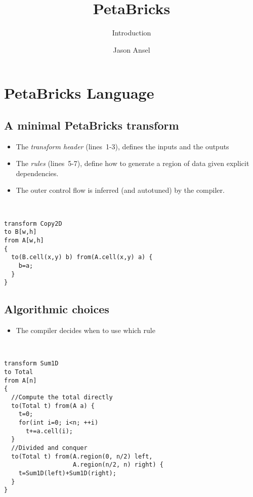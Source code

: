 \documentclass{beamer}
\title{PetaBricks}
\subtitle{Introduction}
\author{Jason Ansel}
\begin{document}


\section{PetaBricks Language}

\subsection{A minimal PetaBricks transform}

\begin{frame}[fragile]
\begin{itemize}
\item The {\em transform header} (lines~1-3), defines the inputs and the outputs
\item The {\em rules} (lines~5-7), define how to generate a region of data
given explicit dependencies.
\item The outer control flow is inferred (and autotuned) by the compiler.
\end{itemize}

~~\begin{minipage}{.5\linewidth}\footnotesize
\begin{lstlisting}
transform Copy2D
to B[w,h]
from A[w,h]
{
  to(B.cell(x,y) b) from(A.cell(x,y) a) {
    b=a;
  }
}
\end{lstlisting}
\end{minipage}
\end{frame}

\subsection{Algorithmic choices}

\begin{frame}[fragile]
\begin{itemize}
\item The compiler decides when to use which rule
\end{itemize}
~~\begin{minipage}{.8\linewidth}\footnotesize
\begin{lstlisting}
transform Sum1D 
to Total
from A[n]
{
  //Compute the total directly 
  to(Total t) from(A a) {
    t=0;
    for(int i=0; i<n; ++i)
      t+=a.cell(i); 
  }
  //Divided and conquer
  to(Total t) from(A.region(0, n/2) left,
                   A.region(n/2, n) right) {
    t=Sum1D(left)+Sum1D(right);
  }
}
\end{lstlisting}
\end{minipage}
\end{frame}
\end{document}
